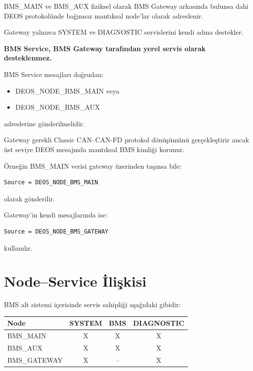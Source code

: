 \documentclass[a4paper,10pt]{article}
\begin{document}
BMS\_MAIN ve BMS\_AUX fiziksel olarak BMS Gateway arkasında
bulunsa dahi DEOS protokolünde bağımsız mantıksal node'lar olarak
adreslenir.

Gateway yalnızca SYSTEM ve DIAGNOSTIC servislerini kendi adına
destekler.

\textbf{BMS Service, BMS Gateway tarafından yerel servis olarak
desteklenmez.}

BMS Service mesajları doğrudan:

\begin{itemize}[nosep]
    \item DEOS\_NODE\_BMS\_MAIN veya
    \item DEOS\_NODE\_BMS\_AUX
\end{itemize}

adreslerine gönderilmelidir.

Gateway gerekli Classic CAN--CAN-FD protokol dönüşümünü gerçekleştirir
ancak üst seviye DEOS mesajında mantıksal BMS kimliği korunur.

Örneğin BMS\_MAIN verisi gateway üzerinden taşınsa bile:

\begin{lstlisting}
Source = DEOS_NODE_BMS_MAIN
\end{lstlisting}

olarak gönderilir.

Gateway'in kendi mesajlarında ise:

\begin{lstlisting}
Source = DEOS_NODE_BMS_GATEWAY
\end{lstlisting}

kullanılır.

\section{Node--Service İlişkisi}

BMS alt sistemi içerisinde servis sahipliği aşağıdaki gibidir:

\begin{center}
\begin{tabular}{l c c c}
\toprule
\textbf{Node} &
\textbf{SYSTEM} &
\textbf{BMS} &
\textbf{DIAGNOSTIC} \\
\midrule

BMS\_MAIN    & X & X & X \\
BMS\_AUX     & X & X & X \\
BMS\_GATEWAY & X & -- & X \\

\bottomrule
\end{tabular}
\end{center}
\end{document}
